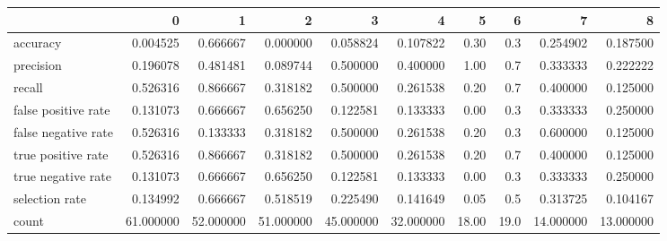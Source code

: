 \begin{tabular}{lrrrrrrrrr}
\toprule
{} &          0 &          1 &          2 &          3 &          4 &      5 &     6 &          7 &          8 \\
\midrule
accuracy            &   0.004525 &   0.666667 &   0.000000 &   0.058824 &   0.107822 &   0.30 &   0.3 &   0.254902 &   0.187500 \\
precision           &   0.196078 &   0.481481 &   0.089744 &   0.500000 &   0.400000 &   1.00 &   0.7 &   0.333333 &   0.222222 \\
recall              &   0.526316 &   0.866667 &   0.318182 &   0.500000 &   0.261538 &   0.20 &   0.7 &   0.400000 &   0.125000 \\
false positive rate &   0.131073 &   0.666667 &   0.656250 &   0.122581 &   0.133333 &   0.00 &   0.3 &   0.333333 &   0.250000 \\
false negative rate &   0.526316 &   0.133333 &   0.318182 &   0.500000 &   0.261538 &   0.20 &   0.3 &   0.600000 &   0.125000 \\
true positive rate  &   0.526316 &   0.866667 &   0.318182 &   0.500000 &   0.261538 &   0.20 &   0.7 &   0.400000 &   0.125000 \\
true negative rate  &   0.131073 &   0.666667 &   0.656250 &   0.122581 &   0.133333 &   0.00 &   0.3 &   0.333333 &   0.250000 \\
selection rate      &   0.134992 &   0.666667 &   0.518519 &   0.225490 &   0.141649 &   0.05 &   0.5 &   0.313725 &   0.104167 \\
count               &  61.000000 &  52.000000 &  51.000000 &  45.000000 &  32.000000 &  18.00 &  19.0 &  14.000000 &  13.000000 \\
\bottomrule
\end{tabular}
